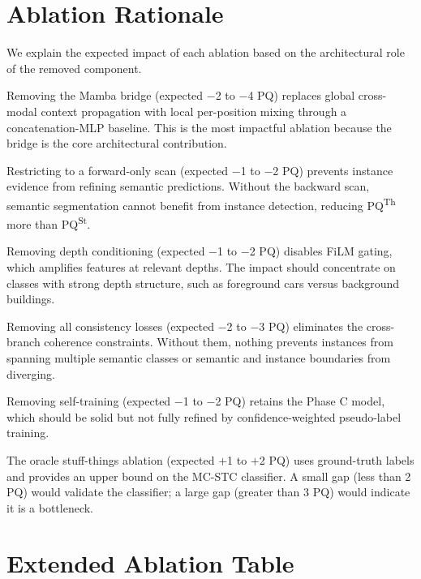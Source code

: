 \documentclass[10pt,twocolumn,letterpaper]{article}
\begin{document}
\section{Ablation Rationale}
\label{sec:supp_ablation_rationale}

We explain the expected impact of each ablation based on the architectural role of the removed component.

Removing the Mamba bridge (expected $-$2 to $-$4 PQ) replaces global cross-modal context propagation with local per-position mixing through a concatenation-MLP baseline. This is the most impactful ablation because the bridge is the core architectural contribution.

Restricting to a forward-only scan (expected $-$1 to $-$2 PQ) prevents instance evidence from refining semantic predictions. Without the backward scan, semantic segmentation cannot benefit from instance detection, reducing PQ\textsuperscript{Th} more than PQ\textsuperscript{St}.

Removing depth conditioning (expected $-$1 to $-$2 PQ) disables FiLM gating, which amplifies features at relevant depths. The impact should concentrate on classes with strong depth structure, such as foreground cars versus background buildings.

Removing all consistency losses (expected $-$2 to $-$3 PQ) eliminates the cross-branch coherence constraints. Without them, nothing prevents instances from spanning multiple semantic classes or semantic and instance boundaries from diverging.

Removing self-training (expected $-$1 to $-$2 PQ) retains the Phase C model, which should be solid but not fully refined by confidence-weighted pseudo-label training.

The oracle stuff-things ablation (expected $+$1 to $+$2 PQ) uses ground-truth labels and provides an upper bound on the MC-STC classifier. A small gap (less than 2 PQ) would validate the classifier; a large gap (greater than 3 PQ) would indicate it is a bottleneck.


\section{Extended Ablation Table}
\label{sec:supp_extended_ablations}
\end{document}
